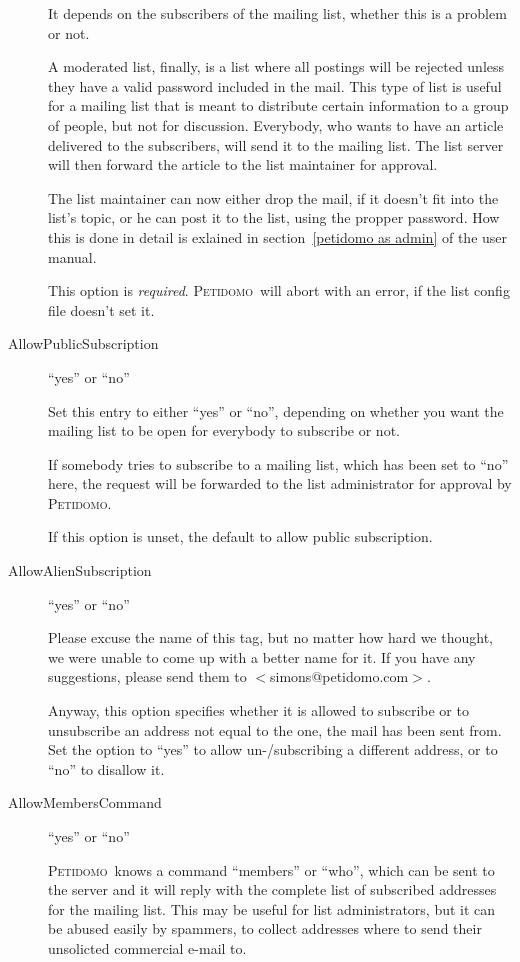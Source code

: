 \documentclass[a4paper,10pt]{scrreprt}
\newcommand{\Petidomo}{{\scshape Peti\-domo}}
\begin{document}
\begin{description}
It depends on the subscribers of the mailing list, whether this is a
problem or not.

A moderated list, finally, is a list where all postings will be
rejected unless they have a valid password included in the mail. This
type of list is useful for a mailing list that is meant to distribute
certain information to a group of people, but not for discussion.
Everybody, who wants to have an article delivered to the subscribers,
will send it to the mailing list. The list server will then forward
the article to the list maintainer for approval.

The list maintainer can now either drop the mail, if it doesn't fit
into the list's topic, or he can post it to the list, using the
propper password. How this is done in detail is exlained in
section~\ref{petidomo as admin} of the user manual.

This option is \emph{required}. \Petidomo\ will abort with an error,
if the list config file doesn't set it.

\item[AllowPublicSubscription] \hfill ``yes'' or ``no''

Set this entry to either ``yes'' or ``no'', depending on whether you
want the mailing list to be open for everybody to subscribe or not.

If somebody tries to subscribe to a mailing list, which has been set
to ``no'' here, the request will be forwarded to the list
administrator for approval by \Petidomo.

If this option is unset, the default to allow public subscription.

\item[AllowAlienSubscription] \hfill ``yes'' or ``no''

Please excuse the name of this tag, but no matter how hard we thought,
we were unable to come up with a better name for it. If you have any
suggestions, please send them to $<$simons@petidomo.com$>$.

Anyway, this option specifies whether it is allowed to subscribe or to
unsubscribe an address not equal to the one, the mail has been sent
from. Set the option to ``yes'' to allow un-/subscribing a different
address, or to ``no'' to disallow it.

\item[AllowMembersCommand] \hfill ``yes'' or ``no''

\Petidomo\ knows a command ``members'' or ``who'', which can be sent
to the server and it will reply with the complete list of subscribed
addresses for the mailing list. This may be useful for list
administrators, but it can be abused easily by spammers, to collect
addresses where to send their unsolicted commercial e-mail to.


\end{description}
\end{document}
